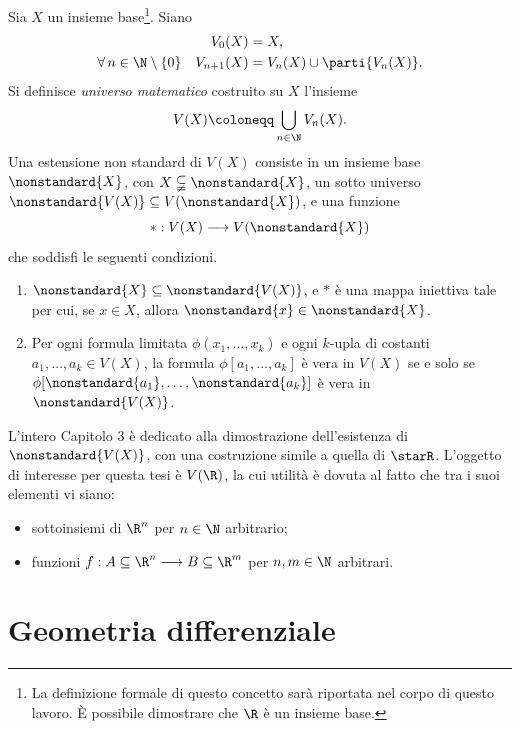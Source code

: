Sia $ X $ un insieme base\footnote{La definizione formale di questo concetto sarà riportata nel corpo di questo lavoro. È possibile dimostrare che $ \R $ è un insieme base.}. Siano \begin{align*}
    V_0(X) &= X, \\\forall\, n \in \N\setminus\{0\}\quad V_{n+1}(X) &= V_{n}(X)\cup\parti{V_{n}(X) }.
\end{align*}Si definisce \emph{universo matematico} costruito su $ X $ l'insieme \begin{equation*}
    V(X)\coloneqq \bigcup_{n \in \N} V_{n}(X). 
\end{equation*}
Una estensione non standard di $ V(X) $ consiste in un insieme base $ \nonstandard{X} $, con $ X \subsetneqq \nonstandard{X} $, un sotto universo $ \nonstandard{V(X)} \subseteq V(\nonstandard{X}) $, e una funzione \begin{equation*}
    *: V(X) \longrightarrow V(\nonstandard{X})
\end{equation*}che soddisfi le seguenti condizioni. \begin{enumerate}
    \item[(I)] $ \nonstandard{X} \subseteq \nonstandard{V(X)} $, e $ * $ è una mappa iniettiva tale per cui, se $ x \in X $, allora $ \nonstandard{x} \in \nonstandard{X} $. 
    \item[(II)] Per ogni formula limitata $ \phi(x_1,\dots,x_{k} ) $ e ogni $ k $-upla di costanti $ a_1,\dots,a_{k} \in V(X)  $, la formula $ \phi[a_1,\dots,a_{k} ] $ è vera in $ V(X) $ se e solo se $ \phi[\nonstandard{a_1},\dots,\nonstandard{a_{k} }] $ è vera in $ \nonstandard{V(X)} $.
\end{enumerate}

L'intero Capitolo 3 è dedicato alla dimostrazione dell'esistenza di $ \nonstandard{V(X)} $, con una costruzione simile a quella di $ \starR $.  L'oggetto di interesse per questa tesi è $ V(\R) $, la cui utilità è dovuta al fatto che tra i suoi elementi vi siano: \begin{itemize}
    \item sottoinsiemi di $ \R^{n} $ per $ n \in \N $ arbitrario;
    \item funzioni $ f: A \subseteq \R^{n} \longrightarrow B \subseteq \R^{m} $ per $ n,m \in \N $ arbitrari.
\end{itemize}

\section*{Geometria differenziale}

